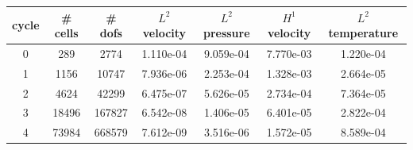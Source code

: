 \documentclass[10pt]{report}
\begin{document}
\begin{table}[H]
\begin{center}
\begin{tabular}{|c|c|c|c|c|c|c|} \hline
cycle & \# cells & \# dofs & $L^2$ velocity & $L^2$ pressure & $H^1$ velocity & $L^2$ temperature\\ \hline
0 & 289 & 2774 & 1.110e-04 & 9.059e-04 & 7.770e-03 & 1.220e-04\\ \hline
1 & 1156 & 10747 & 7.936e-06 & 2.253e-04 & 1.328e-03 & 2.664e-05\\ \hline
2 & 4624 & 42299 & 6.475e-07 & 5.626e-05 & 2.734e-04 & 7.364e-05\\ \hline
3 & 18496 & 167827 & 6.542e-08 & 1.406e-05 & 6.401e-05 & 2.822e-04\\ \hline
4 & 73984 & 668579 & 7.612e-09 & 3.516e-06 & 1.572e-05 & 8.589e-04\\ \hline
\end{tabular}
\end{center}
\end{table}
\end{document}
